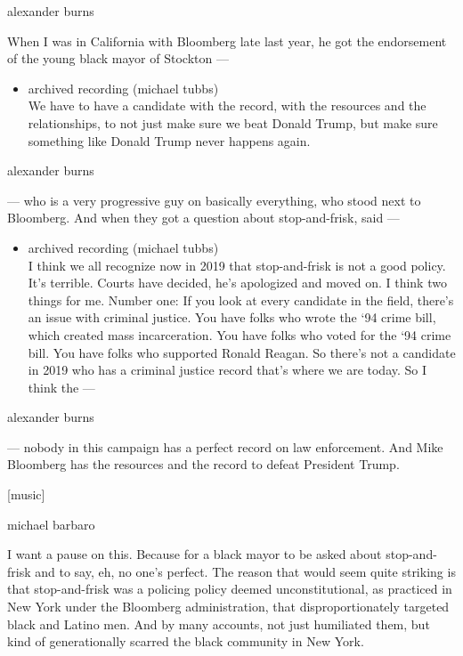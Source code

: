 alexander burns

When I was in California with Bloomberg late last year, he got the
endorsement of the young black mayor of Stockton ---

\begin{itemize}
\tightlist
\item
  archived recording (michael tubbs)\\
  We have to have a candidate with the record, with the resources and
  the relationships, to not just make sure we beat Donald Trump, but
  make sure something like Donald Trump never happens again.
\end{itemize}

alexander burns

--- who is a very progressive guy on basically everything, who stood
next to Bloomberg. And when they got a question about stop-and-frisk,
said ---

\begin{itemize}
\tightlist
\item
  archived recording (michael tubbs)\\
  I think we all recognize now in 2019 that stop-and-frisk is not a good
  policy. It's terrible. Courts have decided, he's apologized and moved
  on. I think two things for me. Number one: If you look at every
  candidate in the field, there's an issue with criminal justice. You
  have folks who wrote the `94 crime bill, which created mass
  incarceration. You have folks who voted for the `94 crime bill. You
  have folks who supported Ronald Reagan. So there's not a candidate in
  2019 who has a criminal justice record that's where we are today. So I
  think the ---
\end{itemize}

alexander burns

--- nobody in this campaign has a perfect record on law enforcement. And
Mike Bloomberg has the resources and the record to defeat President
Trump.

{[}music{]}

michael barbaro

I want a pause on this. Because for a black mayor to be asked about
stop-and-frisk and to say, eh, no one's perfect. The reason that would
seem quite striking is that stop-and-frisk was a policing policy deemed
unconstitutional, as practiced in New York under the Bloomberg
administration, that disproportionately targeted black and Latino men.
And by many accounts, not just humiliated them, but kind of
generationally scarred the black community in New York.

